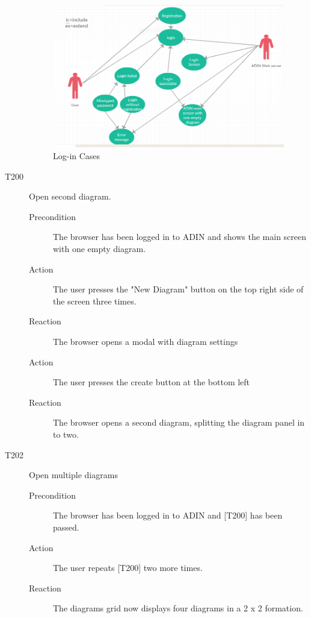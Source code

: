 \documentclass[twoside, english, draft]{Pflichtenheft}
\begin{document}
\begin{description}
\begin{figure}
\centering
\includegraphics[width=\textwidth]{Images/firstcase.png}
\caption{Log-in Cases}
\end{figure}

  \item[T200] Open second diagram.
\begin{description}
    \item[Precondition]
    The browser has been logged in to ADIN and shows the main screen with one empty diagram.
    \item[Action]
    The user presses the "New Diagram" button on the top right side of the screen three times.
    \item[Reaction]
    The browser opens a modal with diagram settings
    \item[Action]
    The user presses the create button at the bottom left
    \item[Reaction]
    The browser opens a second diagram, splitting the diagram panel in to two.

\end{description}


  \item[T202] Open multiple diagrams
\begin{description}
    \item[Precondition]
    The browser has been logged in to ADIN and [T200] has been passed.
    \item[Action]
    The user repeats [T200] two more times.
    \item[Reaction]
    The diagrams grid now displays four diagrams in a 2 x 2 formation.

\end{description}


\end{description}
\end{document}
